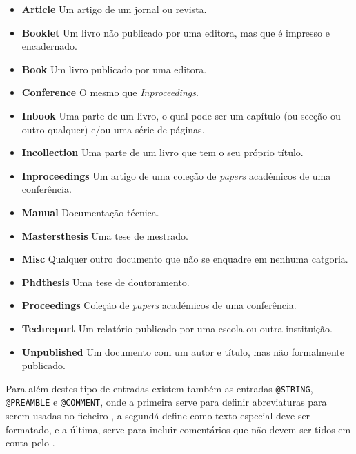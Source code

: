 \begin{itemize}
	\item\textbf{Article      } Um artigo de um jornal ou revista.
    
	\item\textbf{Booklet      } Um livro não publicado por uma editora, mas que
		é impresso e encadernado.
       
	\item\textbf{Book         } Um livro publicado por uma editora.
       
	\item\textbf{Conference   } O mesmo que \emph{Inproceedings}. 
	\item\textbf{Inbook       } Uma parte de um livro, o qual pode ser um capítulo (ou secção ou outro qualquer) e/ou uma série de páginas.
      
	\item\textbf{Incollection } Uma parte de um livro que tem o seu próprio título.
     
	\item\textbf{Inproceedings} Um artigo de uma coleção de \emph{papers} académicos de uma conferência.
   
	\item\textbf{Manual       } Documentação técnica. 
  
	\item\textbf{Mastersthesis} Uma tese de mestrado.
	\item\textbf{Misc         } Qualquer outro documento que não se enquadre em nenhuma
		catgoria.
       
	\item\textbf{Phdthesis    } Uma tese de doutoramento.
      
	\item\textbf{Proceedings  } Coleção de \emph{papers} académicos de uma conferência.
     
	\item\textbf{Techreport   } Um relatório publicado por uma escola ou outra instituição.
    
	\item\textbf{Unpublished  }  Um documento com um autor e título, mas não formalmente
		publicado.

\end{itemize}

Para além destes tipo de entradas existem também as entradas \texttt{@STRING},
\texttt{@PREAMBLE} e \texttt{@COMMENT}, onde a primeira serve para definir
abreviaturas para serem usadas no ficheiro , a segundá define
como texto especial deve ser formatado, e a última, serve para incluir
comentários que não devem ser tidos em conta pelo .




